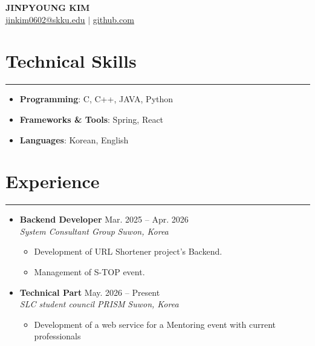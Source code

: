 \documentclass[letterpaper, 10pt]{article}
\begin{document}
\begin{center}
    \textbf{\LARGE JINPYOUNG KIM} \\ \vspace{2pt}
    \href{mailto:jinkim0602@skku.edu}{\underline{jinkim0602@skku.edu}} $|$
    \href{http://github.com/krong12}{\underline{github.com}}
\end{center}

\section*{Technical Skills}
\hrule
\vspace{4pt}
\begin{itemize}
    \item[] \textbf{Programming}: C, C++, JAVA, Python
    \item[] \textbf{Frameworks \& Tools}: Spring, React
    \item[] \textbf{Languages}: Korean, English
\end{itemize}

\section*{Experience}
\hrule
\vspace{4pt}
\begin{itemize}
    \item[]
        \textbf{Backend Developer} \hfill Mar. 2025 -- Apr. 2026 \\ 
        \textit{System Consultant Group} \hfill \textit{Suwon, Korea}
        \begin{itemize}
            \item Development of URL Shortener project's Backend.
            \item Management of S-TOP event.
        \end{itemize}
    \item[]
        \textbf{Technical Part} \hfill May. 2026 -- Present \\ 
        \textit{SLC student council PRISM} \hfill \textit{Suwon, Korea}
        \begin{itemize}
            \item Development of a web service for a Mentoring event with current professionals
        \end{itemize}
\end{itemize}
\end{document}
